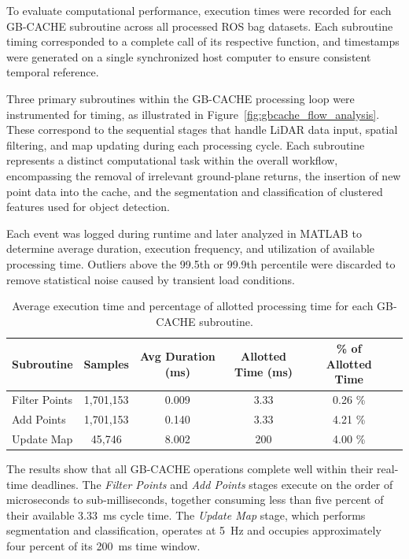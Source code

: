 \documentclass[../main.tex]{subfiles}
\begin{document}
To evaluate computational performance, execution times were recorded for each GB-CACHE subroutine across all processed ROS bag datasets. 
Each subroutine timing corresponded to a complete call of its respective function, and timestamps were generated on a single synchronized host computer to ensure consistent temporal reference.

Three primary subroutines within the GB-CACHE processing loop were instrumented for timing, as illustrated in Figure~\ref{fig:gbcache_flow_analysis}. 
These correspond to the sequential stages that handle LiDAR data input, spatial filtering, and map updating during each processing cycle. 
Each subroutine represents a distinct computational task within the overall workflow, encompassing the removal of irrelevant ground-plane returns, the insertion of new point data into the cache, and the segmentation and classification of clustered features used for object detection.

Each event was logged during runtime and later analyzed in MATLAB to determine average duration, execution frequency, and utilization of available processing time. 
Outliers above the 99.5th or 99.9th percentile were discarded to remove statistical noise caused by transient load conditions.

\begin{table}[htbp]
\centering
\begin{tabular}{lccccc}
\hline
Subroutine & Samples & Avg Duration (ms) & Allotted Time (ms) & \% of Allotted Time\\
\hline
Filter Points & 1,701,153 & 0.009 &  3.33 & 0.26 \% \\
Add Points & 1,701,153 & 0.140 &  3.33 & 4.21 \% \\
Update Map & 45,746 & 8.002 & 200 & 4.00 \% \\
\hline
\end{tabular}
\caption{Average execution time and percentage of allotted processing time for each GB-CACHE subroutine.}
\label{tbl:gbcache_subroutine_results}
\end{table}

The results show that all GB-CACHE operations complete well within their real-time deadlines. 
The \textit{Filter Points} and \textit{Add Points} stages execute on the order of microseconds to sub-milliseconds, together consuming less than five percent of their available 3.33~ms cycle time. 
The \textit{Update Map} stage, which performs segmentation and classification, operates at 5~Hz and occupies approximately four percent of its 200~ms time window.
\end{document}
